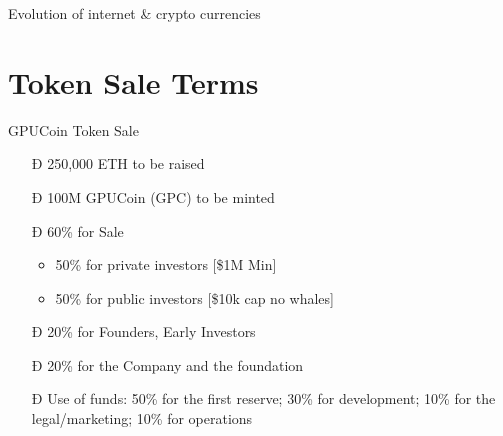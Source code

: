 \documentclass[10pt,handout]{beamer}
\begin{document}
\begin{frame}[t]{Evolution of internet \& crypto currencies}
 
\end{frame} 
\section{Token Sale Terms}
\begin{frame}[fragile]{GPUCoin Token Sale}
 \begin{itemize}[<+-| alert@+>]%
	 
\item[Ð]{250,000 ETH to be raised}
\item[Ð]100M GPUCoin (GPC) to be minted
\item[Ð]60\% for Sale
\begin{itemize}[<+-| alert@+>]
\item 50\% for private investors [\$1M Min]
\item 50\% for public investors [\$10k cap no whales]
\end{itemize}
\item[Ð]{20\% for Founders, Early Investors}
\item[Ð]{20\% for the Company and the foundation}
\item[Ð]{Use of funds: 50\% for the first reserve; 30\% for development; 10\% for the legal/marketing; 10\% for operations}

\end{itemize}

\end{frame}
\end{document}
